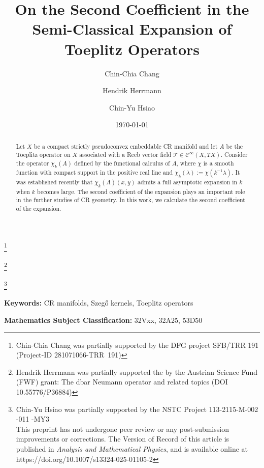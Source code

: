 \documentclass[12pt]{amsart}
\title[On the Second Coefficient in the Semi-Classical Expansion of Toeplitz Operators]{On the Second Coefficient in the Semi-Classical Expansion of Toeplitz Operators}
\theoremstyle{definition}
\theoremstyle{named}
\numberwithin{equation}{subsection}
\def\cC{\mathscr{C}}
\begin{document}
\author[Chin-Chia Chang]{Chin-Chia Chang}
\address{Universit{\"a}t zu K{\"o}ln,  Mathematisches Institut,
	Weyertal 86-90, 50931 K{\"o}ln, Germany}
\thanks{Chin-Chia Chang was partially supported by the DFG project  
	SFB/TRR 191 (Project-ID 281071066-TRR~191)}

\author[Hendrik Herrmann]{Hendrik Herrmann}
\address{University of Vienna, Faculty of Mathematics, Oskar-Morgenstern-Platz 1, 1090 Vienna, Austria}
\thanks{Hendrik Herrmann was partially supported the by the Austrian Science Fund (FWF) grant: The dbar Neumann operator and related topics (DOI 10.55776/P36884)}

\author[Chin-Yu Hsiao]{Chin-Yu Hsiao}
\address{Department of Mathematics, National Taiwan University, Astronomy-Mathematics Building, 
No. 1, Sec. 4, Roosevelt Road, Taipei 10617, Taiwan}
\thanks{Chin-Yu Hsiao was partially supported by the NSTC Project 113-2115-M-002 -011 -MY3\\
This preprint has not undergone peer review or any post-submission improvements or corrections. The Version of Record of this article is published in \textit{Analysis and Mathematical Physics}, and is available online at https://doi.org/10.1007/s13324-025-01105-2}

\date{\today}


\begin{abstract}  Let $X$ be a compact strictly pseudoconvex embeddable 
CR manifold and let
$A$ be the Toeplitz operator on $X$ associated with a Reeb vector field $\mathcal{T}\in\cC^\infty(X,TX)$. Consider the operator $\chi_k(A)$ 
defined by the functional
calculus of $A$, where $\chi$ is a smooth function
with compact support in the positive real line and 
$\chi_k(\lambda):=\chi(k^{-1}\lambda)$. It was established recently that $\chi_k(A)(x,y)$ admits a full asymptotic expansion in $k$ when \(k\) becomes large. The second coefficient of the expansion plays an important role in the further studies of CR geometry. In this work, we calculate the second coefficient of the expansion.
\end{abstract}
\maketitle 
\tableofcontents
\bigskip
\textbf{Keywords:} CR manifolds, Szeg\H{o} kernels, Toeplitz operators

\textbf{Mathematics Subject Classification:} 32Vxx, 32A25, 53D50 
\end{document}
